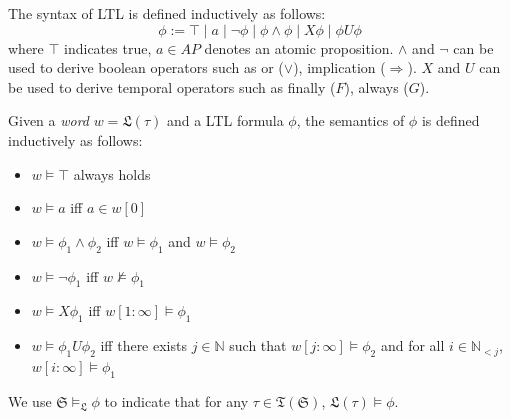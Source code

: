 \documentclass[acmlarge]{acmart}
\begin{document}
The syntax of LTL is defined inductively as follows:
\[
\phi := \top \mid a \mid \lnot \phi \mid \phi \land \phi \mid X \phi \mid \phi U \phi
\]
where $\top$ indicates true, $a \in AP$ denotes an atomic proposition. \(\land\) and \(\lnot\) can be used to derive boolean operators such as or (\(\lor\)), implication (\(\Rightarrow\)). $X$ and $U$ can be used to derive temporal operators such as finally (\(F\)), always (\(G\)).

Given a \emph{word} $w = \mathfrak{L}(\tau)$ and a LTL formula $\phi$, the semantics of $\phi$ is defined inductively as follows:
\begin{itemize}
    \item \(w \models \top \) always holds
    \item \(w \models a\)  iff  \(a \in w[0]\)
    \item \(w \models \phi_1 \land \phi_2\)  iff  \(w \models \phi_1\) and \(w \models \phi_2\)
    \item \(w \models \lnot \phi_1\)  iff  \(w \not\models \phi_1\)
    \item \(w \models X \phi_1\)  iff  \(w[1:\infty] \models \phi_1\)
    \item \(w \models \phi_1 U \phi_2\)  iff  there exists \(j \in \mathbb{N}\) such that \(w[j:\infty] \models \phi_2\) and for all \(i \in \mathbb{N}_{<j}\), \(w[i:\infty] \models \phi_1\)
\end{itemize}

We use $\mathfrak{S} \models_{\mathfrak{L}} \phi$ to indicate that for any $\tau \in \mathfrak{T}(\mathfrak{S})$, $\mathfrak{L}(\tau) \models \phi$.
\end{document}
